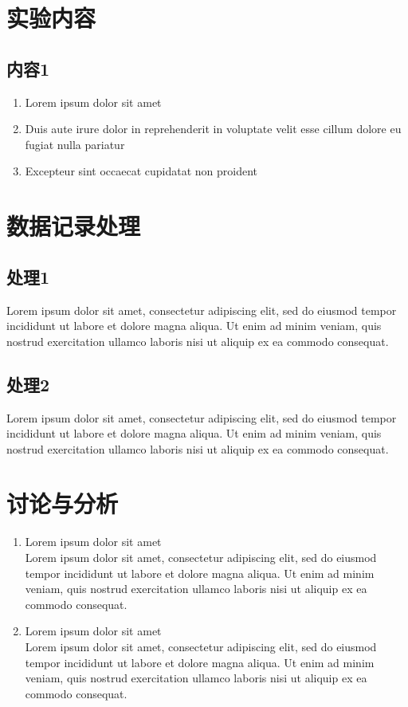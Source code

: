 \documentclass{ctexart}
\begin{document}
\section{实验内容}
\subsection{内容1}
\begin{enumerate}
	\item Lorem ipsum dolor sit amet
	\item Duis aute irure dolor in reprehenderit in voluptate velit esse cillum dolore eu fugiat nulla pariatur
	\item Excepteur sint occaecat cupidatat non proident
\end{enumerate}
\section{数据记录处理}
\subsection{处理1}
Lorem ipsum dolor sit amet, consectetur adipiscing elit, 
sed do eiusmod tempor incididunt ut labore et dolore magna 
aliqua. Ut enim ad minim veniam, quis nostrud exercitation 
ullamco laboris nisi ut aliquip ex ea commodo consequat. 
\subsection{处理2}
Lorem ipsum dolor sit amet, consectetur adipiscing elit, 
sed do eiusmod tempor incididunt ut labore et dolore magna 
aliqua. Ut enim ad minim veniam, quis nostrud exercitation 
ullamco laboris nisi ut aliquip ex ea commodo consequat.
\section{讨论与分析}
\begin{enumerate}
	\item Lorem ipsum dolor sit amet\\ {
	      	Lorem ipsum dolor sit amet, consectetur adipiscing elit, 
			sed do eiusmod tempor incididunt ut labore et dolore magna 
			aliqua. Ut enim ad minim veniam, quis nostrud exercitation 
			ullamco laboris nisi ut aliquip ex ea commodo consequat. 
	      }
	\item Lorem ipsum dolor sit amet\\ {
	      	Lorem ipsum dolor sit amet, consectetur adipiscing elit, 
			sed do eiusmod tempor incididunt ut labore et dolore magna 
			aliqua. Ut enim ad minim veniam, quis nostrud exercitation 
			ullamco laboris nisi ut aliquip ex ea commodo consequat. 
	      }
\end{enumerate}
\end{document}
